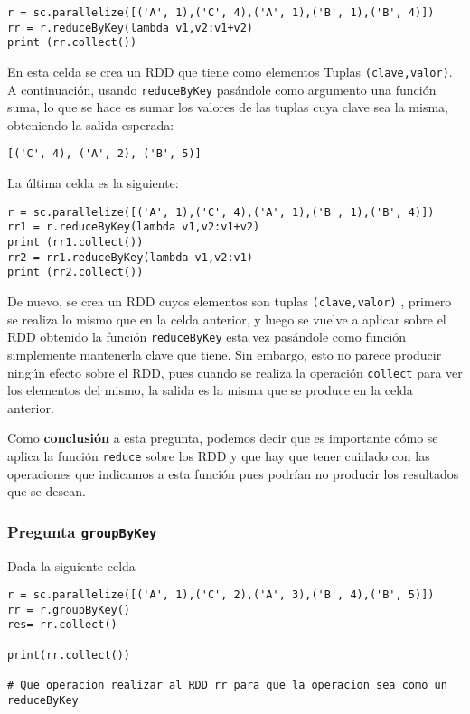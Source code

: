 \documentclass[11pt]{article}
\def\inline{\lstinline[basicstyle=\ttfamily,keywordstyle={}]}
\begin{document}
\begin{verbatim}
r = sc.parallelize([('A', 1),('C', 4),('A', 1),('B', 1),('B', 4)])
rr = r.reduceByKey(lambda v1,v2:v1+v2)
print (rr.collect())
\end{verbatim}

En esta celda se crea un RDD que tiene como elementos Tuplas \inline{(clave,valor)}. A continuación, usando \inline{reduceByKey} pasándole como argumento una función suma, lo que se hace es sumar los valores de las tuplas cuya clave sea la misma, obteniendo la salida esperada:
\begin{verbatim}
[('C', 4), ('A', 2), ('B', 5)]
\end{verbatim}

La última celda es la siguiente:
\begin{verbatim}
r = sc.parallelize([('A', 1),('C', 4),('A', 1),('B', 1),('B', 4)])
rr1 = r.reduceByKey(lambda v1,v2:v1+v2)
print (rr1.collect())
rr2 = rr1.reduceByKey(lambda v1,v2:v1)
print (rr2.collect())
\end{verbatim}

De nuevo, se crea un RDD cuyos elementos son tuplas \inline{(clave,valor)} , primero se realiza lo mismo que en la celda anterior, y luego se vuelve a aplicar sobre el RDD obtenido la función \inline{reduceByKey} esta vez pasándole como función simplemente mantenerla clave que tiene. Sin embargo, esto no parece producir ningún efecto sobre el RDD, pues cuando se realiza la operación \inline{collect} para ver los elementos del mismo, la salida es la misma que se produce en la celda anterior.

Como \textbf{conclusión} a esta pregunta, podemos decir que es importante cómo se aplica la función \inline{reduce} sobre los RDD y que hay que tener cuidado con las operaciones que indicamos a esta función pues podrían no producir los resultados que se desean. 

\subsubsection*{ Pregunta \inline{groupByKey}}

Dada la siguiente celda
\begin{verbatim}
r = sc.parallelize([('A', 1),('C', 2),('A', 3),('B', 4),('B', 5)])
rr = r.groupByKey()
res= rr.collect()

print(rr.collect())

# Que operacion realizar al RDD rr para que la operacion sea como un reduceByKey
\end{verbatim}
\end{document}
